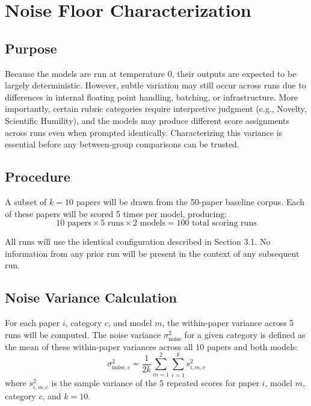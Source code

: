 \documentclass[11pt]{article}
\begin{document}
\section{Noise Floor Characterization}

\subsection{Purpose}

Because the models are run at temperature 0, their outputs are expected to be largely deterministic. However, subtle variation may still occur across runs due to differences in internal floating point handling, batching, or infrastructure. More importantly, certain rubric categories require interpretive judgment (e.g., Novelty, Scientific Humility), and the models may produce different score assignments across runs even when prompted identically. Characterizing this variance is essential before any between-group comparisons can be trusted.

\subsection{Procedure}

A subset of $k = 10$ papers will be drawn from the 50-paper baseline corpus. Each of these papers will be scored 5 times per model, producing:
\begin{equation}
10 \text{ papers} \times 5 \text{ runs} \times 2 \text{ models} = 100 \text{ total scoring runs}
\end{equation}

All runs will use the identical configuration described in Section 3.1. No information from any prior run will be present in the context of any subsequent run.

\subsection{Noise Variance Calculation}

For each paper $i$, category $c$, and model $m$, the within-paper variance across 5 runs will be computed. The noise variance $\sigma^2_{\text{noise}}$ for a given category is defined as the mean of these within-paper variances across all 10 papers and both models:
\begin{equation}
\sigma^2_{\text{noise},c} = \frac{1}{2k} \sum_{m=1}^{2} \sum_{i=1}^{k} s^2_{i,m,c}
\end{equation}
where $s^2_{i,m,c}$ is the sample variance of the 5 repeated scores for paper $i$, model $m$, category $c$, and $k = 10$.
\end{document}
